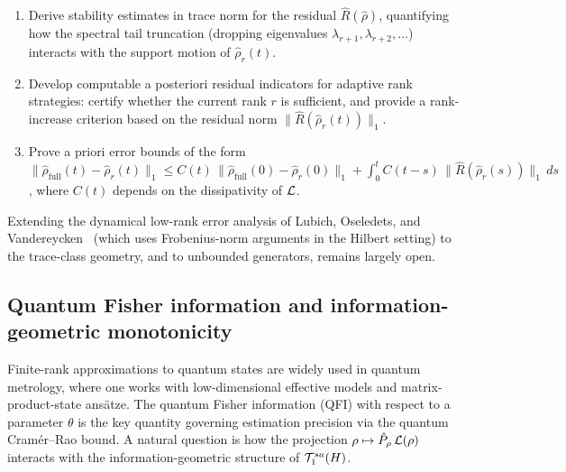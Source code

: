 \begin{problem}
\label{prob:lind:error_bounds}
\begin{enumerate}
\item[\textup{(a)}] Derive stability estimates in trace norm for the
    residual $\hat R(\hat\rho)$, quantifying how the spectral tail
    truncation (dropping eigenvalues $\lambda_{r+1}, \lambda_{r+2},\ldots$)
    interacts with the support motion of $\hat\rho_r(t)$.
\item[\textup{(b)}] Develop computable a posteriori residual indicators
    for adaptive rank strategies: certify whether the current rank $r$
    is sufficient, and provide a rank-increase criterion based on the
    residual norm $\|\hat R(\hat\rho_r(t))\|_1$.
\item[\textup{(c)}] Prove a priori error bounds of the form
    $\|\hat\rho_{\mathrm{full}}(t) - \hat\rho_r(t)\|_1 \leq
    C(t)\,\|\hat\rho_{\mathrm{full}}(0) - \hat\rho_r(0)\|_1 +
    \int_0^t C(t-s)\,\|\hat R(\hat\rho_r(s))\|_1\,ds$,
    where $C(t)$ depends on the dissipativity of $\mathcal{L}$.
\end{enumerate}
Extending the dynamical low-rank error analysis of Lubich, Oseledets,
and Vandereycken~\cite{LubichOseledetsVandereycken2015} (which uses
Frobenius-norm arguments in the Hilbert setting) to the trace-class
geometry, and to unbounded generators, remains largely open.
\end{problem}

\subsection*{Quantum Fisher information and information-geometric monotonicity}

Finite-rank approximations to quantum states are widely used in quantum
metrology, where one works with low-dimensional effective models and
matrix-product-state ans\"{a}tze. The quantum Fisher information (QFI)
with respect to a parameter $\theta$ is the key quantity governing
estimation precision via the quantum Cram\'{e}r--Rao bound. A natural
question is how the projection $\rho \mapsto \hat P_\rho\,\mathcal{L}(\rho)$
interacts with the information-geometric structure of $\mathcal{T}_{1}^{sa}(H)$.

